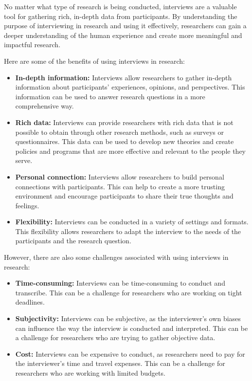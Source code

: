 \documentclass[
  b5paper]{book}
\begin{document}
No matter what type of research is being conducted, interviews are a valuable tool for gathering rich, in-depth data from participants. By understanding the purpose of interviewing in research and using it effectively, researchers can gain a deeper understanding of the human experience and create more meaningful and impactful research.

Here are some of the benefits of using interviews in research:

\begin{itemize}
\item
  \textbf{In-depth information:} Interviews allow researchers to gather in-depth information about participants' experiences, opinions, and perspectives. This information can be used to answer research questions in a more comprehensive way.
\item
  \textbf{Rich data:} Interviews can provide researchers with rich data that is not possible to obtain through other research methods, such as surveys or questionnaires. This data can be used to develop new theories and create policies and programs that are more effective and relevant to the people they serve.
\item
  \textbf{Personal connection:} Interviews allow researchers to build personal connections with participants. This can help to create a more trusting environment and encourage participants to share their true thoughts and feelings.
\item
  \textbf{Flexibility:} Interviews can be conducted in a variety of settings and formats. This flexibility allows researchers to adapt the interview to the needs of the participants and the research question.
\end{itemize}

However, there are also some challenges associated with using interviews in research:

\begin{itemize}
\item
  \textbf{Time-consuming:} Interviews can be time-consuming to conduct and transcribe. This can be a challenge for researchers who are working on tight deadlines.
\item
  \textbf{Subjectivity:} Interviews can be subjective, as the interviewer's own biases can influence the way the interview is conducted and interpreted. This can be a challenge for researchers who are trying to gather objective data.
\item
  \textbf{Cost:} Interviews can be expensive to conduct, as researchers need to pay for the interviewer's time and travel expenses. This can be a challenge for researchers who are working with limited budgets.
\end{itemize}
\end{document}
